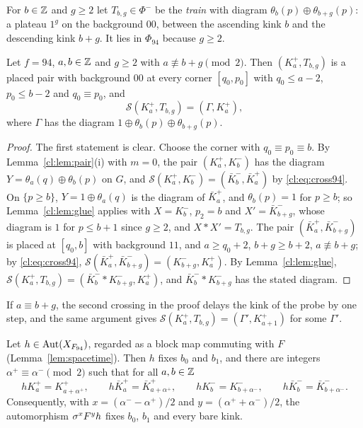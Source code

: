 For $b\in\mathbb{Z}$ and $g\ge2$ let $T_{b,g}\in\Phi^-$ be the \emph{train} with diagram $\theta_b(p)\oplus\theta_{b+g}(p)$: a plateau $1^g$ on the background $00$, between the ascending kink $b$ and the descending kink $b+g$. It lies in $\Phi_{94}$ because $g\ge2$.

\begin{lemma}[train]\label{cl:lem:train}
Let $f=94$, $a,b\in\mathbb{Z}$ and $g\ge2$ with $a\not\equiv b+g\pmod2$. Then $(K^+_a,T_{b,g})$ is a placed pair with background $00$ at every corner $[q_0,p_0]$ with $q_0\le a-2$, $p_0\le b-2$ and $q_0\equiv p_0$, and
\[
\mathcal S(K^+_a,T_{b,g})=(\Gamma,K^+_a),
\]
where $\Gamma$ has the diagram $1\oplus\theta_b(p)\oplus\theta_{b+g}(p)$.
\end{lemma}

\begin{proof}
The first statement is clear. Choose the corner with $q_0\equiv p_0\equiv b$. By Lemma~\ref{cl:lem:pair}(i) with $m=0$, the pair $(K^+_a,K^-_b)$ has the diagram $Y=\theta_a(q)\oplus\theta_b(p)$ on $G$, and $\mathcal S(K^+_a,K^-_b)=(\bar K^-_b,\bar K^+_a)$ by \eqref{cl:eq:cross94}. On $\{p\ge b\}$, $Y=1\oplus\theta_a(q)$ is the diagram of $\bar K^+_a$, and $\theta_b(p)=1$ for $p\ge b$; so Lemma~\ref{cl:lem:glue} applies with $X=K^-_b$, $p_2=b$ and $X'=\bar K^-_{b+g}$, whose diagram is $1$ for $p\le b+1$ since $g\ge2$, and $X*X'=T_{b,g}$. The pair $(\bar K^+_a,\bar K^-_{b+g})$ is placed at $[q_0,b]$ with background $11$, and $a\ge q_0+2$, $b+g\ge b+2$, $a\not\equiv b+g$; by \eqref{cl:eq:cross94}, $\mathcal S(\bar K^+_a,\bar K^-_{b+g})=(K^-_{b+g},K^+_a)$. By Lemma~\ref{cl:lem:glue}, $\mathcal S(K^+_a,T_{b,g})=(\bar K^-_b*K^-_{b+g},K^+_a)$, and $\bar K^-_b*K^-_{b+g}$ has the stated diagram.
\end{proof}

If $a\equiv b+g$, the second crossing in the proof delays the kink of the probe by one step, and the same argument gives $\mathcal S(K^+_a,T_{b,g})=(\Gamma',K^+_{a+1})$ for some $\Gamma'$.

\begin{theorem}\label{cl:thm:KR94}
Let $h\in\operatorname{Aut}(X_{F_{94}})$, regarded as a block map commuting with $F$ (Lemma~\ref{lem:spacetime}). Then $h$ fixes $b_0$ and $b_1$, and there are integers $\alpha^+\equiv\alpha^-\pmod2$ such that for all $a,b\in\mathbb{Z}$
\[
hK^+_a=K^+_{a+\alpha^+},\qquad h\bar K^+_a=\bar K^+_{a+\alpha^+},\qquad hK^-_b=K^-_{b+\alpha^-},\qquad h\bar K^-_b=\bar K^-_{b+\alpha^-}.
\]
Consequently, with $x=(\alpha^--\alpha^+)/2$ and $y=(\alpha^++\alpha^-)/2$, the automorphism $\sigma^xF^yh$ fixes $b_0$, $b_1$ and every bare kink.
\end{theorem}

